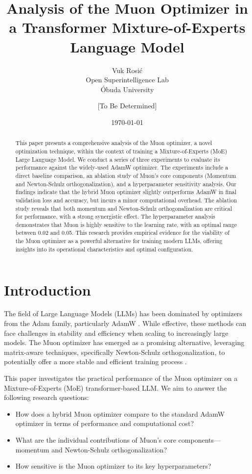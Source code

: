 \documentclass[11pt, a4paper]{article}
\title{\textbf{Analysis of the Muon Optimizer in a Transformer Mixture-of-Experts Language Model}}
\author{Vuk Rosić \\ Open Superintelligence Lab \\ Óbuda University \and [To Be Determined]}
\date{\today}
\begin{document}
\maketitle

\begin{abstract}
This paper presents a comprehensive analysis of the Muon optimizer, a novel optimization technique, within the context of training a Mixture-of-Experts (MoE) Large Language Model. We conduct a series of three experiments to evaluate its performance against the widely-used AdamW optimizer. The experiments include a direct baseline comparison, an ablation study of Muon's core components (Momentum and Newton-Schulz orthogonalization), and a hyperparameter sensitivity analysis. Our findings indicate that the hybrid Muon optimizer slightly outperforms AdamW in final validation loss and accuracy, but incurs a minor computational overhead. The ablation study reveals that both momentum and Newton-Schulz orthogonalization are critical for performance, with a strong synergistic effect. The hyperparameter analysis demonstrates that Muon is highly sensitive to the learning rate, with an optimal range between 0.02 and 0.05. This research provides empirical evidence for the viability of the Muon optimizer as a powerful alternative for training modern LLMs, offering insights into its operational characteristics and optimal configuration.
\end{abstract}

\section{Introduction}
The field of Large Language Models (LLMs) has been dominated by optimizers from the Adam family, particularly AdamW \cite{loshchilov2017decoupled}. While effective, these methods can face challenges in stability and efficiency when scaling to increasingly large models. The Muon optimizer has emerged as a promising alternative, leveraging matrix-aware techniques, specifically Newton-Schulz orthogonalization, to potentially offer a more stable and efficient training process \cite{bernstein2020metricizing}.

This paper investigates the practical performance of the Muon optimizer on a Mixture-of-Experts (MoE) transformer-based LLM. We aim to answer the following research questions:
\begin{itemize}
    \item How does a hybrid Muon optimizer compare to the standard AdamW optimizer in terms of performance and computational cost?
    \item What are the individual contributions of Muon's core components—momentum and Newton-Schulz orthogonalization?
    \item How sensitive is the Muon optimizer to its key hyperparameters?
\end{itemize}
\end{document}
